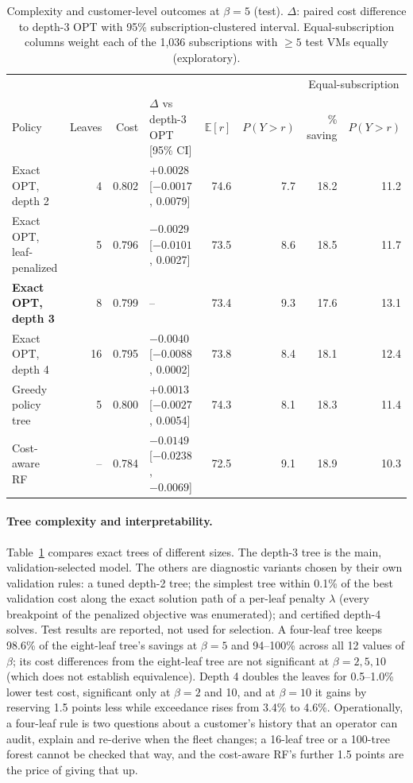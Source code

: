\documentclass[10pt]{article}
\newcommand{\Ex}{\mathbb{E}}
\begin{document}
\begin{table}[t]
\centering\small
\caption{Complexity and customer-level outcomes at $\beta=5$ (test). $\Delta$: paired cost difference to depth-3 OPT with 95\% subscription-clustered interval. Equal-subscription columns weight each of the 1,036 subscriptions with $\ge5$ test VMs equally (exploratory).}
\label{tab:complex}
\setlength{\tabcolsep}{4pt}
\begin{tabular}{lrrlrr|rr}
\toprule
 & & & & & & \multicolumn{2}{c}{Equal-subscription} \\
Policy & Leaves & Cost & $\Delta$ vs depth-3 OPT [95\% CI] & $\Ex[r]$ & $P(Y{>}r)$ & \% saving & $P(Y{>}r)$ \\
\midrule
Exact OPT, depth 2 & 4 & 0.802 & $+0.0028$ [$-0.0017$, 0.0079] & 74.6 & 7.7 & 18.2 & 11.2 \\
Exact OPT, leaf-penalized & 5 & 0.796 & $-0.0029$ [$-0.0101$, 0.0027] & 73.5 & 8.6 & 18.5 & 11.7 \\
\textbf{Exact OPT, depth 3} & 8 & 0.799 & -- & 73.4 & 9.3 & 17.6 & 13.1 \\
Exact OPT, depth 4 & 16 & 0.795 & $-0.0040$ [$-0.0088$, 0.0002] & 73.8 & 8.4 & 18.1 & 12.4 \\
Greedy policy tree & 5 & 0.800 & $+0.0013$ [$-0.0027$, 0.0054] & 74.3 & 8.1 & 18.3 & 11.4 \\
Cost-aware RF & -- & 0.784 & $-0.0149$ [$-0.0238$, $-0.0069$] & 72.5 & 9.1 & 18.9 & 10.3 \\
\bottomrule
\end{tabular}
\end{table}

\paragraph{Tree complexity and interpretability.} Table~\ref{tab:complex} compares exact trees of different sizes. The depth-3 tree is the main, validation-selected model. The others are diagnostic variants chosen by their own validation rules: a tuned depth-2 tree; the simplest tree within 0.1\% of the best validation cost along the exact solution path of a per-leaf penalty $\lambda$ (every breakpoint of the penalized objective was enumerated); and certified depth-4 solves. Test results are reported, not used for selection. A four-leaf tree keeps 98.6\% of the eight-leaf tree's savings at $\beta=5$ and 94--100\% across all 12 values of $\beta$; its cost differences from the eight-leaf tree are not significant at $\beta=2,5,10$ (which does not establish equivalence). Depth 4 doubles the leaves for 0.5--1.0\% lower test cost, significant only at $\beta=2$ and 10, and at $\beta=10$ it gains by reserving 1.5 points less while exceedance rises from 3.4\% to 4.6\%. Operationally, a four-leaf rule is two questions about a customer's history that an operator can audit, explain and re-derive when the fleet changes; a 16-leaf tree or a 100-tree forest cannot be checked that way, and the cost-aware RF's further 1.5 points are the price of giving that up.
\end{document}
